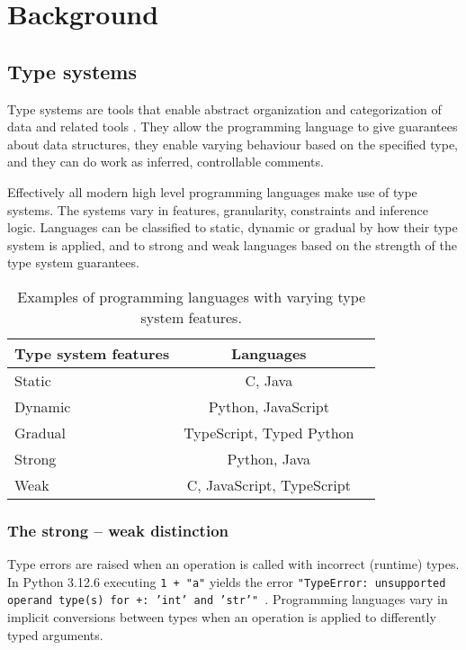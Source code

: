 \chapter{Background\label{background}}

\section{Type systems}

Type systems are tools that enable abstract organization and categorization of data and related tools \cite{programming_langs}. They allow the programming language to give guarantees about data structures, they enable varying behaviour based on the specified type, and they can do work as inferred, controllable comments.

Effectively all modern high level programming languages make use of type systems. The systems vary in features, granularity, constraints and inference logic. Languages can be classified to static, dynamic or gradual by how their type system is applied, and to strong and weak languages based on the strength of the type system guarantees.

\begin{table}[h!]
    \centering
    \begin{tabular}{@{}lcl@{}}
    \toprule
    Type system features       & Languages      \\ \midrule
    Static          & C,  Java           \\
    Dynamic         & Python, JavaScript \\ 
    Gradual         & TypeScript, Typed Python \\ \midrule
    Strong          & Python, Java \\
    Weak            & C, JavaScript, TypeScript  \\ \bottomrule
    \end{tabular}
    \caption{Examples of programming languages with varying type system features.}
    \label{table:1}
\end{table}

\subsection{The strong -- weak distinction}
Type errors are raised when an operation is called with incorrect (runtime) types. In Python 3.12.6 executing {\tt 1 + "a"} yields the error {\tt "TypeError: unsupported operand type(s) for +: 'int' and 'str'" }. Programming languages vary in implicit conversions between types when an operation is applied to differently typed arguments. 


